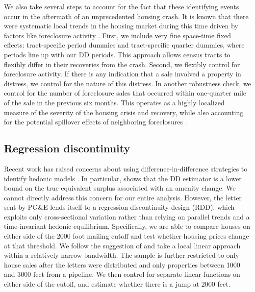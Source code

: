 \documentclass[12pt]{article}
\begin{document}
We also take several steps to account for the fact that these identifying
events occur in the aftermath of an unprecedented housing crash. It
is known that there were systematic local trends in the housing market
during this time driven by factors like foreclosure activity \citep{campbell_forced_2011}.
First, we include very fine space-time fixed effects: tract-specific
period dummies and tract-specific quarter dummies, where periods line
up with our DD periods. This approach allows census tracts to flexibly
differ in their recoveries from the crash. Second, we flexibly control
for foreclosure activity. If there is any indication that a sale involved
a property in distress, we control for the nature of this distress.
In another robustness check, we control for the number of foreclosure
sales that occurred within one-quarter mile of the sale in the previous
six months. This operates as a highly localized measure of the severity
of the housing crisis and recovery, while also accounting for the
potential spillover effects of neighboring foreclosures \citep{campbell_forced_2011,anenberg_estimates_2014}.

\subsection{Regression discontinuity\label{subsec:Regression-discontinuity}}

Recent work has raised concerns about using difference-in-difference strategies to identify hedonic models \citep{banzhaf_panel_2015,kuminoff_capitalization_2014}. In particular, \citet{banzhaf_panel_2015} shows that the DD estimator is a lower bound on the true equivalent surplus associated with an amenity change. We cannot directly address this concern for our entire analysis. However, the letter sent by PG\&E lends itself to a regression discontinuity design (RDD), which exploits only cross-sectional variation rather than relying on parallel trends and a time-invariant hedonic equilibrium. Specifically, we are able to compare houses on either side of the 2000 foot mailing cutoff and test whether housing prices change at that threshold. We follow the suggestion of \citet{imbens_regression_2008} and take a local linear approach within a relatively narrow bandwidth. The sample is further restricted to only house sales after the letters were distributed and only properties between 1000 and 3000 feet from a pipeline. We then control for separate linear functions on either side of the cutoff, and estimate whether there is a jump at 2000 feet. 
\end{document}
